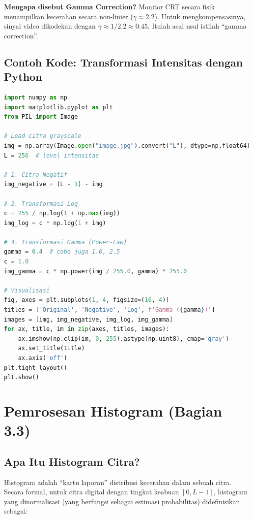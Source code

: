 \documentclass[12pt,a4paper]{article}
\begin{document}
\begin{tipbox}
\textbf{Mengapa disebut Gamma Correction?} Monitor CRT secara fisik menampilkan kecerahan secara non-linier ($\gamma \approx 2.2$). Untuk mengkompensasinya, sinyal video dikodekan dengan $\gamma \approx 1/2.2 \approx 0.45$. Itulah asal usul istilah ``gamma correction''.
\end{tipbox}

\subsection{Contoh Kode: Transformasi Intensitas dengan Python}

\begin{lstlisting}[language=Python, caption={Implementasi transformasi intensitas dasar}]
import numpy as np
import matplotlib.pyplot as plt
from PIL import Image

# Load citra grayscale
img = np.array(Image.open("image.jpg").convert("L"), dtype=np.float64)
L = 256  # level intensitas

# 1. Citra Negatif
img_negative = (L - 1) - img

# 2. Transformasi Log
c = 255 / np.log(1 + np.max(img))
img_log = c * np.log(1 + img)

# 3. Transformasi Gamma (Power-Law)
gamma = 0.4  # coba juga 1.0, 2.5
c = 1.0
img_gamma = c * np.power(img / 255.0, gamma) * 255.0

# Visualisasi
fig, axes = plt.subplots(1, 4, figsize=(16, 4))
titles = ['Original', 'Negative', 'Log', f'Gamma ({gamma})']
images = [img, img_negative, img_log, img_gamma]
for ax, title, im in zip(axes, titles, images):
    ax.imshow(np.clip(im, 0, 255).astype(np.uint8), cmap='gray')
    ax.set_title(title)
    ax.axis('off')
plt.tight_layout()
plt.show()
\end{lstlisting}

\section{Pemrosesan Histogram (Bagian 3.3)}

\subsection{Apa Itu Histogram Citra?}

Histogram adalah ``kartu laporan'' distribusi kecerahan dalam sebuah citra. Secara formal, untuk citra digital dengan tingkat keabuan $[0, L-1]$, histogram yang dinormalisasi (yang berfungsi sebagai estimasi probabilitas) didefinisikan sebagai:
\end{document}
